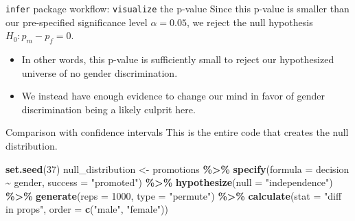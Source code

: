 \documentclass[
  ignorenonframetext,
]{beamer}
\newenvironment{Shaded}{\begin{snugshade}}{\end{snugshade}}
\newcommand{\AttributeTok}[1]{\textcolor[rgb]{0.13,0.29,0.53}{#1}}
\newcommand{\DecValTok}[1]{\textcolor[rgb]{0.00,0.00,0.81}{#1}}
\newcommand{\FunctionTok}[1]{\textcolor[rgb]{0.13,0.29,0.53}{\textbf{#1}}}
\newcommand{\NormalTok}[1]{#1}
\newcommand{\OtherTok}[1]{\textcolor[rgb]{0.56,0.35,0.01}{#1}}
\newcommand{\SpecialCharTok}[1]{\textcolor[rgb]{0.81,0.36,0.00}{\textbf{#1}}}
\newcommand{\StringTok}[1]{\textcolor[rgb]{0.31,0.60,0.02}{#1}}
\begin{document}
\begin{frame}{\texttt{infer} package workflow: \texttt{visualize} the
p-value}
\protect\hypertarget{infer-package-workflow-visualize-the-p-value-2}{}
Since this p-value is smaller than our pre-specified significance level
\(\alpha=0.05\), we reject the null hypothesis \(H_0: p_m-p_f=0\).

\begin{itemize}
\item
  In other words, this p-value is sufficiently small to reject our
  hypothesized universe of no gender discrimination.
\item
  We instead have enough evidence to change our mind in favor of gender
  discrimination being a likely culprit here.
\end{itemize}
\end{frame}

\begin{frame}[fragile]{Comparison with confidence intervals}
\protect\hypertarget{comparison-with-confidence-intervals}{}
This is the entire code that creates the null distribution.

\begin{Shaded}
\begin{Highlighting}[]
\FunctionTok{set.seed}\NormalTok{(}\DecValTok{37}\NormalTok{)}
\NormalTok{null\_distribution }\OtherTok{\textless{}{-}}\NormalTok{ promotions }\SpecialCharTok{\%\textgreater{}\%} 
  \FunctionTok{specify}\NormalTok{(}\AttributeTok{formula =}\NormalTok{ decision }\SpecialCharTok{\textasciitilde{}}\NormalTok{ gender, }
          \AttributeTok{success =} \StringTok{"promoted"}\NormalTok{) }\SpecialCharTok{\%\textgreater{}\%} 
  \FunctionTok{hypothesize}\NormalTok{(}\AttributeTok{null =} \StringTok{"independence"}\NormalTok{) }\SpecialCharTok{\%\textgreater{}\%} 
  \FunctionTok{generate}\NormalTok{(}\AttributeTok{reps =} \DecValTok{1000}\NormalTok{, }\AttributeTok{type =} \StringTok{"permute"}\NormalTok{) }\SpecialCharTok{\%\textgreater{}\%} 
  \FunctionTok{calculate}\NormalTok{(}\AttributeTok{stat =} \StringTok{"diff in props"}\NormalTok{, }
            \AttributeTok{order =} \FunctionTok{c}\NormalTok{(}\StringTok{"male"}\NormalTok{, }\StringTok{"female"}\NormalTok{))}
\end{Highlighting}
\end{Shaded}
\end{frame}
\end{document}
